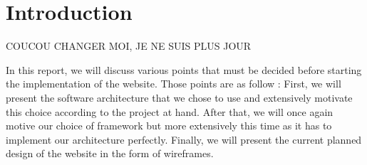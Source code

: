 
\section{Introduction}

COUCOU CHANGER MOI, JE NE SUIS PLUS JOUR

In this report, we will discuss various points that must be decided before starting the implementation of the website. Those points are as follow : First, we will present the software architecture that we chose to use and extensively motivate this choice according to the project at hand. After that, we will once again motive our choice of framework but more extensively this time as it has to implement our architecture perfectly. Finally, we will present the current planned design of the website in the form of wireframes.